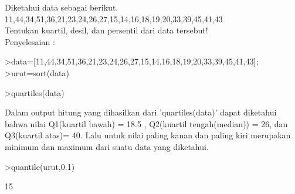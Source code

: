 \documentclass[12pt,arial,letterpaper]{book}
\begin{document}
\begin{eulercomment}
\begin{eulercomment}
\begin{eulercomment}
\begin{eulercomment}
\begin{eulercomment}
\begin{eulercomment}
\begin{eulercomment}
\begin{eulercomment}
\begin{eulercomment}
\begin{eulercomment}
\begin{eulercomment}
\begin{eulercomment}
\begin{eulercomment}
\begin{eulercomment}
\begin{eulercomment}
\begin{eulercomment}
\begin{eulercomment}
\begin{eulercomment}
\begin{eulercomment}
\begin{eulercomment}
\begin{eulercomment}
\begin{eulercomment}
\begin{eulercomment}
\begin{eulercomment}
\begin{eulercomment}
\begin{eulercomment}
\begin{eulercomment}
\begin{eulercomment}
\begin{eulercomment}
\begin{eulercomment}
\begin{eulercomment}
\begin{eulercomment}
\begin{eulercomment}
\begin{eulercomment}
\begin{eulercomment}
\begin{eulercomment}
\begin{eulercomment}
\begin{eulercomment}
\begin{eulercomment}
\end{eulercomment}
\begin{eulercomment}
Diketahui data sebagai berikut.\\
11,44,34,51,36,21,23,24,26,27,15,14,16,18,19,20,33,39,45,41,43\\
Tentukan kuartil, desil, dan persentil dari data tersebut!\\
Penyelesaian :
\end{eulercomment}
\begin{eulerprompt}
>data=[11,44,34,51,36,21,23,24,26,27,15,14,16,18,19,20,33,39,45,41,43];
>urut=sort(data)
\end{eulerprompt}
\begin{euleroutput}
  [11,  14,  15,  16,  18,  19,  20,  21,  23,  24,  26,  27,  33,  34,
  36,  39,  41,  43,  44,  45,  51]
\end{euleroutput}
\begin{eulerprompt}
>quartiles(data)
\end{eulerprompt}
\begin{euleroutput}
  [11,  18.5,  26,  40,  51]
\end{euleroutput}
\begin{eulercomment}
Dalam output hitung yang dihasilkan dari 'quartiles(data)' dapat
diketahui bahwa nilai Q1(kuartil bawah) = 18.5 , Q2(kuartil
tengah(median)) = 26, dan Q3(kuartil atas)= 40. Lalu untuk nilai
paling kanan dan paling kiri merupakan minimum dan maximum dari suatu
data yang diketahui.
\end{eulercomment}
\begin{eulerprompt}
>quantile(urut,0.1)
\end{eulerprompt}
\begin{euleroutput}
  15

\end{euleroutput}
\end{eulercomment}
\end{eulercomment}
\end{eulercomment}
\end{eulercomment}
\end{eulercomment}
\end{eulercomment}
\end{eulercomment}
\end{eulercomment}
\end{eulercomment}
\end{eulercomment}
\end{eulercomment}
\end{eulercomment}
\end{eulercomment}
\end{eulercomment}
\end{eulercomment}
\end{eulercomment}
\end{eulercomment}
\end{eulercomment}
\end{eulercomment}
\end{eulercomment}
\end{eulercomment}
\end{eulercomment}
\end{eulercomment}
\end{eulercomment}
\end{eulercomment}
\end{eulercomment}
\end{eulercomment}
\end{eulercomment}
\end{eulercomment}
\end{eulercomment}
\end{eulercomment}
\end{eulercomment}
\end{eulercomment}
\end{eulercomment}
\end{eulercomment}
\end{eulercomment}
\end{eulercomment}
\end{eulercomment}
\end{document}
